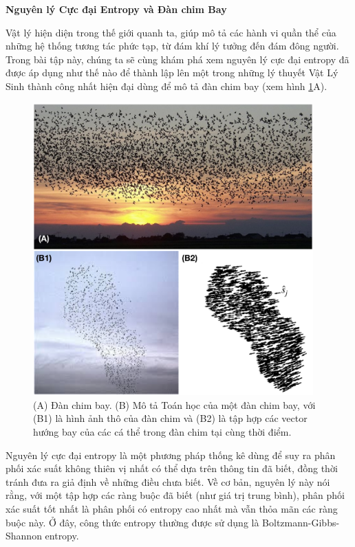 \textbf{Nguyên lý Cực đại Entropy và Đàn chim Bay}

Vật lý hiện diện trong thế giới quanh ta, giúp mô tả các hành vi quần thể của những hệ thống tương tác phức tạp, từ đám khí lý tưởng đến đám đông người. Trong bài tập này, chúng ta sẽ cùng khám phá xem nguyên lý cực đại entropy đã được áp dụng như thế nào để thành lập lên một trong những lý thuyết Vật Lý Sinh thành công nhất hiện đại dùng để mô tả đàn chim bay (xem hình \ref{fig:Bird}A).

\begin{figure}[!h]
    \centering\includegraphics[width=0.96\textwidth]{Problem_5/Figs_P5/fig01.png}
    \caption{(A) Đàn chim bay. (B) Mô tả Toán học của một đàn chim bay, với (B1) là hình ảnh thô của đàn chim và (B2) là tập hợp các vector hướng bay của các cá thể trong đàn chim tại cùng thời điểm.}
    \label{fig:Bird}
\end{figure}

Nguyên lý cực đại entropy là một phương pháp thống kê dùng để suy ra phân phối xác suất không thiên vị nhất có thể dựa trên thông tin đã biết, đồng thời tránh đưa ra giả định về những điều chưa biết. Về cơ bản, nguyên lý này nói rằng, với một tập hợp các ràng buộc đã biết (như giá trị trung bình), phân phối xác suất tốt nhất là phân phối có entropy cao nhất mà vẫn thỏa mãn các ràng buộc này. Ở đây, công thức entropy thường được sử dụng là Boltzmann-Gibbs-Shannon entropy.

